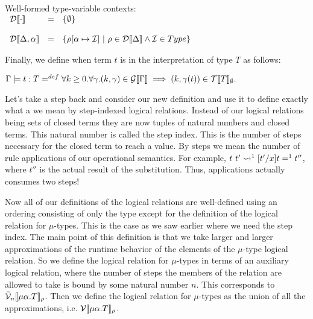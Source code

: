 \begin{definition}
  \label{def:well-formed_type_var_subs}
  Well-formed type-variable contexts:\\
  \begin{math}
    \begin{array}{lll}
      \dinterp{\cdot} & = & \{ \emptyset \}\\
      & \\
      \dinterp{\Delta,\alpha} & = & \{ \rho[\alpha \mapsto \interpset]\ |\ 
      \rho \in \dinterp{\Delta} \land \interpset \in Type \}\\
    \end{array}
  \end{math}
\end{definition}
\noindent
Finally, we define when term $t$ is in the interpretation of type $T$ as follows:
\begin{center}
  \begin{math}
    \Gamma \models t : T =^{def} \forall k \geq 0 . \forall \gamma.(k, \gamma) \in 
    \mathcal{G}[\negthinspace[\Gamma]\negthinspace] \implies (k, \gamma(t)) \in \mathcal{T}[\negthinspace[T]\negthinspace]_\emptyset.
  \end{math}
\end{center}

Let's take a step back and consider our new definition and use it to
define exactly what a we mean by step-indexed logical relations.
Instead of our logical relations being sets of closed terms they are
now tuples of natural numbers and closed terms.  This natural number
is called the step index.  This is the number of steps necessary for
the closed term to reach a value.  By steps we mean the number of rule
applications of our operational semantics.  
For example, $t\ t'
\rightsquigarrow^1 [t'/x]t =^1 t''$, where $t''$ is the actual result of the
substitution.  Thus, applications actually consumes two steps!

Now all of our definitions of the logical relations are well-defined
using an ordering consisting of only the type except for the
definition of the logical relation for $\mu$-types.  This is the case
as we saw earlier where we need the step index.  The main point of
this definition is that we take larger and larger approximations of
the runtime behavior of the elements of the $\mu$-type logical
relation.  So we define the logical relation for $\mu$-types in terms
of an auxiliary logical relation, where the number of steps the members
of the relation are allowed to take is bound by some natural number
$n$.  This corresponds to $\bar{\mathcal{V}}_{n}[\negthinspace[\mu \alpha.T]\negthinspace]_\rho$.  Then
we define the logical relation for $\mu$-types as the union of all the
approximations, i.e. $\mathcal{V}[\negthinspace[\mu \alpha.T]\negthinspace]_\rho$.  

